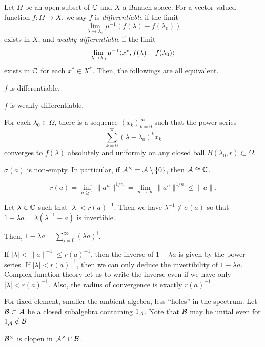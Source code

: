 \documentclass{../note}
\begin{document}
\begin{prb}
Let $\Omega$ be an open subset of $\mathbb{C}$ and $X$ a Banach space.
For a vector-valued function $f:\Omega\to X$, we say $f$ is \emph{differentiable} if the limit
\[\lim_{\lambda\to\lambda_0}\mu^{-1}(f(\lambda)-f(\lambda_0))\]
exists in $X$, and \emph{weakly differentiable} if the limit
\[\lim_{\lambda\to\lambda_0}\mu^{-1}\langle x^*,f(\lambda)-f(\lambda_0)\rangle\]
exists in $\mathbb{C}$ for each $x^*\in X^*$.
Then, the followings are all equivalent.
\begin{parts}
\item $f$ is differentiable.
\item $f$ is weakly differentiable.
\item For each $\lambda_0\in\Omega$, there is a sequence $(x_k)_{k=0}^\infty$ such that the power series
\[\sum_{k=0}^\infty(\lambda-\lambda_0)^kx_k\]
converges to $f(\lambda)$ absolutely and uniformly on any closed ball $\bar{B(\lambda_0,r)}\subset\Omega$.
\end{parts}
\end{prb}


\begin{prb}
$\sigma(a)$ is non-empty.
In particular, if $\mathcal{A}^\times=\mathcal{A}\setminus\{0\}$, then $\mathcal{A}\cong\mathbb{C}$.
\end{prb}

\begin{prb}[Beurling]
\[r(a)=\inf_{n\ge1}\|a^n\|^{1/n}=\lim_{n\to\infty}\|a^n\|^{1/n}\le\|a\|.\]
\end{prb}
\begin{pf}
Let $\lambda\in\mathbb{C}$ such that $|\lambda|<r(a)^{-1}$.
Then we have $\lambda^{-1}\notin\sigma(a)$ so that $1-\lambda a=\lambda(\lambda^{-1}-a)$ is invertible.


Then, $1-\lambda a=\sum_{i=0}^\infty(\lambda a)^i$.


If $|\lambda|<\|a\|^{-1}\le r(a)^{-1}$, then the inverse of $1-\lambda a$ is given by the power series.
If $|\lambda|<r(a)^{-1}$, then we can only deduce the invertibility of $1-\lambda a$.
Complex function theory let us to write the inverse even if we have only $|\lambda|<r(a)^{-1}$.
Also, the radius of convergence is exactly $r(a)^{-1}$.
\end{pf}

\begin{prb}
For fixed element, smaller the ambient algebra, less ``holes'' in the spectrum.
Let $\mathcal{B}\subset\mathcal{A}$ be a closed subalgebra containing $1_{\mathcal{A}}$.
Note that $\mathcal{B}$ may be unital even for $1_{\mathcal{A}}\notin\mathcal{B}$.
\begin{parts}
\item $\mathcal{B}^\times$ is clopen in $\mathcal{A}^\times\cap\mathcal{B}$.
\end{parts}
\end{prb}
\end{document}
